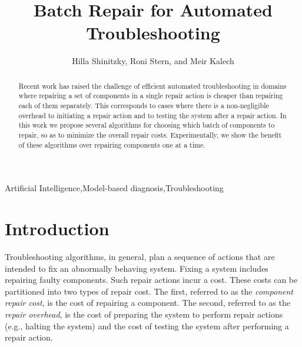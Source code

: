 \documentclass[review]{elsarticle}
\begin{document}
\begin{frontmatter}

\title{Batch Repair for Automated Troubleshooting}

\author{Hilla Shinitzky, Roni Stern, and Meir Kalech}
\address{Ben Gurion University of the Negev}






\begin{abstract}
Recent work has raised the challenge of efficient automated troubleshooting in domains where repairing a set of components in a single repair action is cheaper than repairing each of them separately. This corresponds to cases where there is a non-negligible overhead to initiating a repair action and to testing the system after a repair action. In this work we propose several algorithms for choosing which batch of components to repair, so as to minimize the overall repair costs. Experimentally, we show the benefit of these algorithms over repairing components one at a time. %
\end{abstract}

\begin{keyword}
Artificial Intelligence\sep Model-based diagnosis\sep Troubleshooting
\end{keyword}

\end{frontmatter}

\linenumbers



\section{Introduction}
\label{sec:introduction}
Troubleshooting algorithms, in general, plan a sequence of actions that are intended to fix an abnormally behaving system. Fixing a system includes repairing faulty components. Such repair actions incur a cost. These costs can be partitioned into two types of repair cost. The first, referred to as the {\em component repair cost}, is the cost of repairing a component. The second, referred to as the {\em repair overhead}, is the cost of preparing the system to perform repair actions (e.g., halting the system) and the cost of testing the system after performing a repair action.
\end{document}
